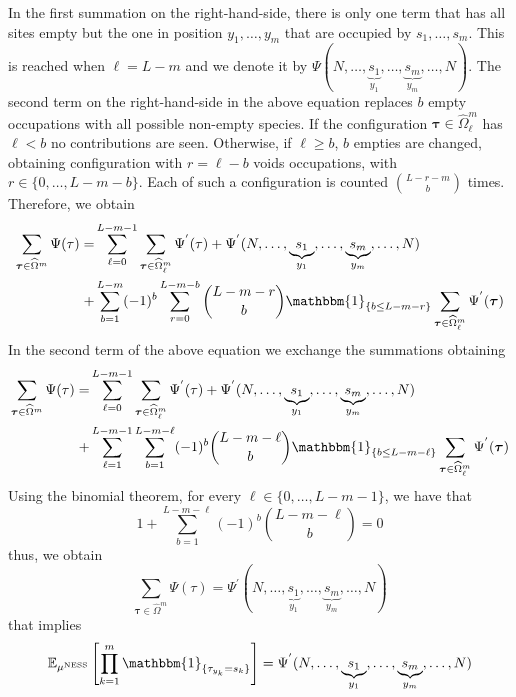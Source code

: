 \documentclass[10pt]{article}
\numberwithin{equation}{section}
\numberwithin{equation}{subsection}
\begin{document}
In the first summation on the right-hand-side, there is only one term that has all sites empty but the one in position $y_{1},\ldots,y_{m}$ that are occupied by $s_{1},\ldots,s_{m}$. This is reached when $\ell=L-m$ and we denote it by $\Psi(N,\ldots,\underbrace{s_{1}}_{y_{1}},\ldots,\underbrace{s_{m}}_{y_{m}},\ldots,N)$. The second term on the right-hand-side in the above equation replaces $b$ empty occupations with all possible non-empty species. If the configuration $\bm{\tau}\in\widehat{\Omega}_{\ell}^{m}$ has $\ell<b$ no contributions are seen. Otherwise, if $\ell\geq b$, $b$ empties are changed, obtaining configuration with $r=\ell-b$ voids occupations, with $r\in \{0,\ldots, L-m-b\}$. Each of such a configuration is counted $\binom{L-r-m}{b}$ times. Therefore, we obtain 
\begin{align}
	\sum_{\bm{\tau}\in \widehat{\Omega}^{m}}\Psi(\tau)=& \sum_{\ell=0}^{L-m-1}\sum_{\bm{\tau}\in \widehat{\Omega}^{m}_{\ell}}\Psi^{'}(\tau)+\Psi^{'}(N,\ldots,\underbrace{s_{1}}_{y_{1}},\ldots,\underbrace{s_{m}}_{y_{m}},\ldots,N)\nonumber
	\\+&\sum_{b=1}^{L-m}(-1)^{b}\sum_{r=0}^{L-m-b}\binom{L-m-r}{b}\mathbbm{1}_{\{b\leq L-m-r\}}\sum_{\bm{\tau}\in \widehat{\Omega}^{m}_{\ell}}\Psi^{'}(\bm{\tau})
\end{align}
In the second term of the above equation we exchange the summations obtaining 
\begin{align}
\sum_{\bm{\tau}\in \widehat{\Omega}^{m}}\Psi(\tau)=&\sum_{\ell=0}^{L-m-1}\sum_{\bm{\tau}\in \widehat{\Omega}^{m}_{\ell}}\Psi^{'}(\tau)+\Psi^{'}(N,\ldots,\underbrace{s_{1}}_{y_{1}},\ldots,\underbrace{s_{m}}_{y_{m}},\ldots,N)\nonumber
\\+&\sum_{\ell=1}^{L-m-1}\sum_{b=1}^{L-m-\ell}(-1)^{b}\binom{L-m-\ell}{b}\mathbbm{1}_{\{b\leq L-m-\ell\}}\sum_{\bm{\tau}\in \widehat{\Omega}^{m}_{\ell}}\Psi^{'}(\bm{\tau})
\end{align}
Using the binomial theorem, for every $\ell\in \{0,\ldots, L-m-1\}$, we have that
\begin{equation}
	1+\sum_{b=1}^{L-m-\ell}(-1)^{b}\binom{L-m-\ell}{b}=0
\end{equation}
thus, we obtain 
\begin{equation}
\sum_{\bm{\tau}\in \widehat{\Omega}^{m}}\Psi(\tau)=\Psi^{'}(N,\ldots,\underbrace{s_{1}}_{y_{1}},\ldots,\underbrace{s_{m}}_{y_{m}},\ldots,N)
\end{equation}
that implies 
\begin{equation}\label{shorter-chain}
\mathbb{E}_{\mu^{\text{NESS}}}\left[\prod_{k=1}^{m}\mathbbm{1}_{\{\tau_{y_{k}}=s_{k}\}}\right]=\Psi^{'}(N,\ldots,\underbrace{s_{1}}_{y_{1}},\ldots,\underbrace{s_{m}}_{y_{m}},\ldots,N)
\end{equation}
\end{document}
